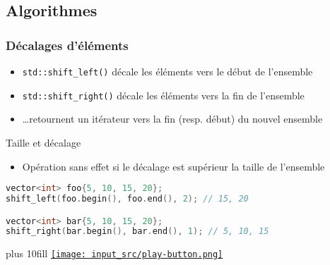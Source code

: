 \documentclass[C++.tex]{subfiles}
\begin{document}
\subsection*{Algorithmes}
\begin{frame}[fragile]
	\frametitle{Décalages d'éléments}
	\begin{itemize}
		\item \lstinline|std::shift_left()| décale les éléments vers le début de l'ensemble
		\item \lstinline|std::shift_right()| décale les éléments vers la fin de l'ensemble
		\item \ldots retournent un itérateur vers la fin (resp. début) du nouvel ensemble
	\end{itemize}

	\begin{block}{Taille et décalage}
		\begin{itemize}
			\item Opération sans effet si le décalage est supérieur la taille de l'ensemble
		\end{itemize}
	\end{block}

	\begin{lstlisting}[language=C++]
vector<int> foo{5, 10, 15, 20};
shift_left(foo.begin(), foo.end(), 2); // 15, 20

vector<int> bar{5, 10, 15, 20};
shift_right(bar.begin(), bar.end(), 1); // 5, 10, 15\end{lstlisting}

	\vskip 10mm plus 10fill
	\hfill
	\href{https://godbolt.org/#g:!((g:!((g:!((h:codeEditor,i:(filename:'1',fontScale:14,fontUsePx:'0',j:1,lang:c%2B%2B,selection:(endColumn:1,endLineNumber:25,positionColumn:1,positionLineNumber:25,selectionStartColumn:1,selectionStartLineNumber:25,startColumn:1,startLineNumber:25),source:'%23include+%3Cvector%3E%0A%23include+%3Calgorithm%3E%0A%23include+%3Ciostream%3E%0A%0Aint+main()%0A%7B%0A++std::vector%3Cint%3E+foo%7B5,+10,+15,+20%7D%3B%0A++std::shift_left(foo.begin(),+foo.end(),+2)%3B%0A++//+%7B15,+20,+%3F,+,%7D%0A++for(int+i+:+foo)%0A++%7B%0A++++++std::cout+%3C%3C+i+%3C%3C+%22+%22%3B%0A++%7D%0A++std::cout+%3C%3C+%22%5Cn%22%3B%0A%0A++std::vector%3Cint%3E+bar%7B5,+10,+15,+20%7D%3B%0A++std::shift_right(bar.begin(),+bar.end(),+1)%3B%0A++//+%7B%3F,+5,+10,+15%7D%0A++for(int+i+:+bar)%0A++%7B%0A++++++std::cout+%3C%3C+i+%3C%3C+%22+%22%3B%0A++%7D%0A++std::cout+%3C%3C+%22%5Cn%22%3B%0A%7D%0A'),l:'5',n:'0',o:'C%2B%2B+source+%231',t:'0')),k:50,l:'4',n:'0',o:'',s:0,t:'0'),(g:!((h:executor,i:(argsPanelShown:'1',compilationPanelShown:'0',compiler:g112,compilerOutShown:'0',execArgs:'',execStdin:'',fontScale:14,fontUsePx:'0',j:1,lang:c%2B%2B,libs:!((name:boost,ver:'175')),options:'-std%3Dc%2B%2B20',source:1,stdinPanelShown:'1',tree:'1',wrap:'0'),l:'5',n:'0',o:'Executor+x86-64+gcc+11.2+(C%2B%2B,+Editor+%231)',t:'0')),header:(),k:50,l:'4',n:'0',o:'',s:0,t:'0')),l:'2',n:'0',o:'',t:'0')),version:4}{\texttt{[image: input\_src/play-button.png]}}
\end{frame}
\end{document}
